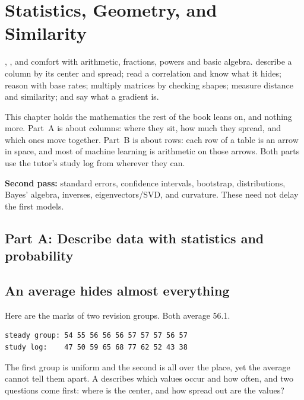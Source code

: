 \chapter{Statistics, Geometry, and Similarity}
\label{ch:foundations}
\label{ch:statistics}
\label{ch:linear-algebra}

\chapterguide%
  {, , and comfort with arithmetic, fractions, powers and basic algebra.}
  {describe a column by its center and spread; read a correlation and know what it hides; reason with base rates; multiply matrices by checking shapes; measure distance and similarity; and say what a gradient is.}

This chapter holds the mathematics the rest of the book leans on, and nothing more. Part~A is about columns: where they sit, how much they spread, and which ones move together. Part~B is about rows: each row of a table is an arrow in space, and most of machine learning is arithmetic on those arrows. Both parts use the tutor's study log from  wherever they can.

\begin{secondpass}
\textbf{Second pass:} standard errors, confidence intervals, bootstrap, distributions, Bayes' algebra, inverses, eigenvectors/SVD, and curvature. These need not delay the first models.
\end{secondpass}

\section*{Part A: Describe data with statistics and probability}
\section{An average hides almost everything}

Here are the marks of two revision groups. Both average 56.1.

\begin{lstlisting}[style=utpterminal]
steady group: 54 55 56 56 56 57 57 57 56 57
study log:    47 50 59 65 68 77 62 52 43 38
\end{lstlisting}

The first group is uniform and the second is all over the place, yet the average cannot tell them apart. A  describes which values occur and how often, and two questions come first: where is the center, and how spread out are the values?

